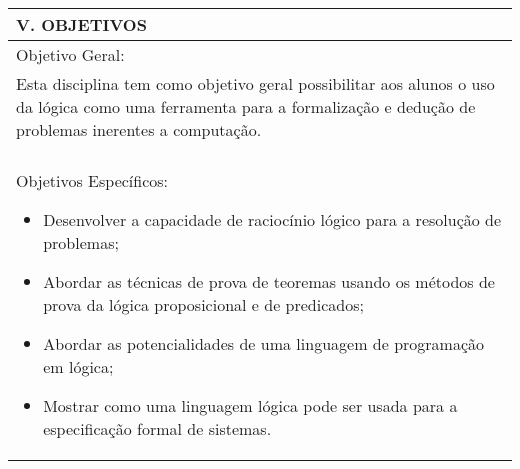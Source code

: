 \documentclass[12pt]{article}
\begin{document}
\begin{longtable}{|L{1.025\textwidth}|} \hline
%
{\bf V. OBJETIVOS } \\ \hline
%
Objetivo Geral:\\
Esta disciplina tem como objetivo geral possibilitar aos alunos o uso da lógica como uma ferramenta para a formalização e dedução de problemas inerentes a computação.\\
\\
Objetivos Específicos:
\begin{itemize}
\item  Desenvolver a capacidade de raciocínio lógico para a resolução de problemas;
\item Abordar as técnicas de prova de teoremas usando os métodos de prova da lógica proposicional e de predicados;
\item Abordar as potencialidades de uma linguagem de programação em lógica;
\item Mostrar como uma linguagem lógica pode ser usada para a especificação formal de sistemas.
\end{itemize}
\\ \hline
\end{longtable}
\end{document}
